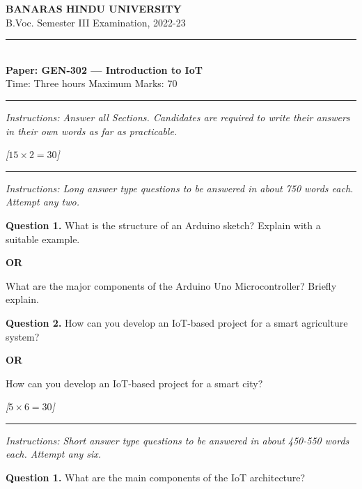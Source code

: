 \documentclass[11pt,a4paper]{article}
\newcommand{\pts}[1]{\hfill   \textit{[#1]}}
\begin{document}
\begin{center}
  {\large\bfseries BANARAS HINDU UNIVERSITY}\\[2pt]
  {\normalsize B.Voc. Semester III Examination, 2022-23}\\[6pt]
  \rule{0.8\linewidth}{0.5pt}\\[6pt]
  {\large\bfseries Paper: GEN-302 --- Introduction to IoT}\\[4pt]
  {\normalsize Time: Three hours \hfill Maximum Marks: 70}
\end{center}

\rule{\linewidth}{0.4pt}

\smallskip



\noindent   \textit{Instructions: Answer all Sections. Candidates are required to write their answers in their own words as far as practicable.}

\bigskip

\bigskip


\pts{$15  \times 2 = 30$}
\rule{\linewidth}{0.4pt}\smallskip




\noindent   \textit{Instructions: Long answer type questions to be answered in about 750 words each. Attempt any two.}

\medskip


\noindent   \textbf{Question 1.} What is the structure of an Arduino sketch? Explain with a suitable example.
\centerline{   \textbf{OR}}
What are the major components of the Arduino Uno Microcontroller? Briefly explain.

\medskip


\noindent   \textbf{Question 2.} How can you develop an IoT-based project for a smart agriculture system?
\centerline{   \textbf{OR}}
How can you develop an IoT-based project for a smart city?

\bigskip


\pts{$5  \times 6 = 30$}
\rule{\linewidth}{0.4pt}\smallskip




\noindent   \textit{Instructions: Short answer type questions to be answered in about 450-550 words each. Attempt any six.}

\medskip


\noindent   \textbf{Question 1.} What are the main components of the IoT architecture?
\end{document}
